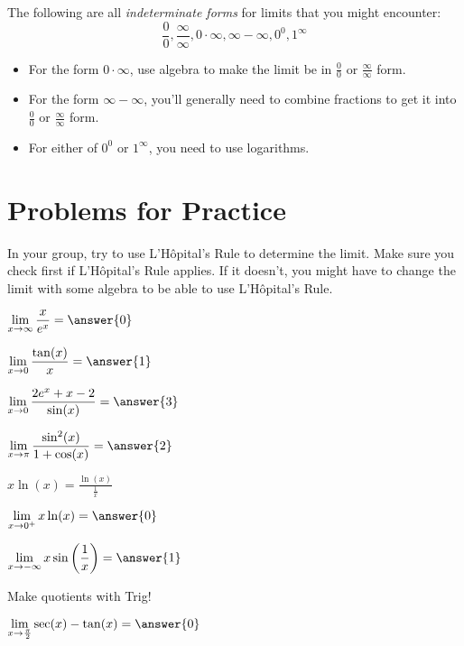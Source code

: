 \documentclass{ximera}
\begin{document}
The following are all \emph{indeterminate forms} for limits that you might encounter:
\[
    \frac{0}{0}, \frac{\infty}{\infty}, 0 \cdot \infty, \infty - \infty, 0^0, 1^{\infty}
\]

\begin{itemize}
\item For the form $0 \cdot \infty$, use algebra to make the limit be in $\frac{0}{0}$ or $\frac{\infty}{\infty}$ form.

\item For the form $\infty - \infty$, you'll generally need to combine fractions to get it into $\frac{0}{0}$ or $\frac{\infty}{\infty}$ form.

\item For either of $0^0$ or $1^{\infty}$, you need to use logarithms.

\end{itemize}

\section{Problems for Practice}

In your group, try to use L'H\^{o}pital's Rule to determine the limit. Make sure you check first if L'H\^{o}pital's Rule applies. If it doesn't, you might have to change the limit with some algebra to be able to use L'H\^{o}pital's Rule.

    \begin{problem}
     $\dlim_{x \to \infty} \df{x}{e^x} = \answer{0}$
    \end{problem}
    \begin{problem}
     $\dlim_{x \to 0} \df{\tan(x)}{x} = \answer{1}$
    \end{problem}
    \begin{problem}
     $\dlim_{x \to 0} \df{2e^x + x - 2}{\sin(x)} = \answer{3}$
    \end{problem}
    \begin{problem}
     $\dlim_{x \to \pi} \df{\sin^2(x)}{1+\cos(x)} = \answer{2}$
    \end{problem}
    \begin{problem}
    \begin{hint}
    $x\ln(x) = \frac{\ln(x)}{\frac{1}{x}}$
    \end{hint}
    $\dlim_{x \to 0^+} x \ln(x) = \answer{0}$
    \end{problem}
    \begin{problem}
    $\dlim_{x \to -\infty} x\sin\left(\frac{1}{x}\right) = \answer{1}$
    \end{problem}
    \begin{problem}
    \begin{hint}
    Make quotients with Trig!
    \end{hint}
    $\dlim_{x \to \frac{\pi}{2}} \sec(x) - \tan(x) = \answer{0}$
    \end{problem}
\end{document}
